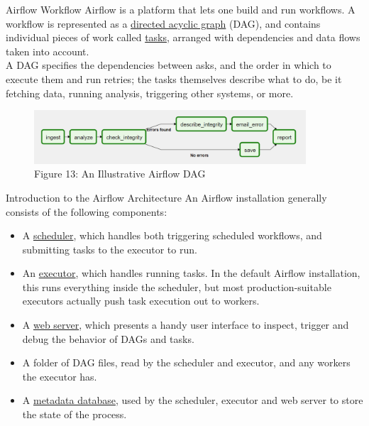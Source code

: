 \documentclass[pdf]{beamer}
\theoremstyle{remark}
\theoremstyle{definition}
\begin{document}
\begin{frame}[t]{Airflow Workflow}
Airflow is a platform that lets one build and run workflows. A workflow is represented as a \href{https://airflow.apache.org/docs/apache-airflow/stable/concepts/dags.html}{directed acyclic graph} (DAG), and contains individual pieces of work called \href{https://airflow.apache.org/docs/apache-airflow/stable/concepts/tasks.html}{tasks}, arranged with dependencies and data flows taken into account. \\
\vspace{1.5ex}
A DAG specifies the dependencies between asks, and the order in which to execute them and run retries; the tasks themselves describe what to do, be it fetching data, running analysis, triggering other systems, or more. \\
\vspace{1.5ex}
\begin{figure}[htbp]
  \captionsetup{justification=centering}
  \includegraphics[height=2cm, trim=0.0cm 0.0cm 0.0cm 0.0cm width=2cm]{Images/AirFlow_DAG_Example.png}
  \caption{Figure {\color{franklinblue} 13}: An Illustrative Airflow DAG}
\end{figure}
\end{frame}

\begin{frame}[t]{Introduction to the Airflow Architecture}
An Airflow installation generally consists of the following components: \\
\vspace{0.0ex}
\small
\begin{itemize}
  \item A \href{https://airflow.apache.org/docs/apache-airflow/stable/concepts/scheduler.html}{scheduler}, which handles both triggering scheduled workflows, and submitting tasks to the executor to run. 
  \item An \href{https://airflow.apache.org/docs/apache-airflow/stable/executor/index.html}{executor}, which handles running tasks. In the default Airflow installation, this runs everything inside the scheduler, but most production-suitable executors actually push task execution out to workers.
  \item A \href{https://developer.mozilla.org/en-US/docs/Learn/Common_questions/What_is_a_web_server}{web server}, which presents a handy user interface to inspect, trigger and debug the behavior of DAGs and tasks.
  \item A folder of DAG files, read by the scheduler and executor, and any workers the executor has.
  \item A \href{https://docs.astronomer.io/learn/airflow-database}{metadata database}, used by the scheduler, executor and web server to store the state of the process.
\end{itemize}
\end{frame}
\end{document}
